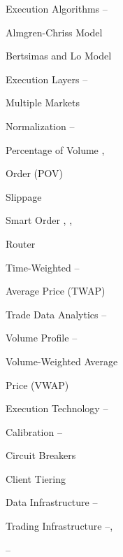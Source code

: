 \begin{multicols}{2}
\noindent Execution Algorithms \hfill \pageref{in:exec_alg1}--\pageref{in:exec_alg2} \par
\twoindent Almgren-Chriss Model \hfill \pageref{in:alm_chriss} \par
\twoindent Bertsimas and Lo Model \hfill \pageref{in:bert_lo} \par
\twoindent Execution Layers \hfill \pageref{in:exec_layer1}--\pageref{in:exec_layer2} \par
\twoindent Multiple Markets \hfill  \pageref{in:mult_mark} \par 
\twoindent Normalization \hfill \pageref{in:normalization1}--\pageref{in:normalization2} \par
\twoindent Percentage of Volume \hfill \pageref{in:pov1}, \pageref{in:pov2} \par \hspace{0.75cm} Order (POV) \par 
\twoindent Slippage \hfill \pageref{in:slippage} \par
\twoindent Smart Order \hfill \pageref{in:sor1}, \pageref{in:sor2}, \pageref{in:sor3} \par \hspace{0.75cm} Router \par
\twoindent Time-Weighted \hfill \pageref{in:twap1}--\pageref{in:twap2} \par
\hspace{0.75cm} Average Price (TWAP) \par
\twoindent Trade Data Analytics \hfill \pageref{in:tda1}--\pageref{in:tda2} \par
\twoindent Volume Profile \hfill \pageref{in:vol_prof1}--\pageref{in:vol_prof2} \par
\twoindent Volume-Weighted Average \hfill \pageref{in:vwap} \par \hspace{0.75cm} Price (VWAP)
\vspace{\baselineskip}


\noindent Execution Technology \hfill \pageref{in:exec_tech1}--\pageref{in:exec_tech2} \par
\twoindent Calibration \hfill \pageref{in:calb1}--\pageref{in:calb2} \par
\twoindent Circuit Breakers \hfill \pageref{in:circ_br} \par
\twoindent Client Tiering \hfill \pageref{in:client_t1} \par %
\twoindent Data Infrastructure \hfill \pageref{in:dat_infr1}--\pageref{in:dat_infr2} \par
\twoindent Trading Infrastructure \hfill \pageref{in:trad_infr1}--\pageref{in:trad_infr2}, \par \hfill \pageref{in:trad_infr3}--\pageref{in:trad_infr4}\, \par
\vspace{\baselineskip}



\end{multicols}
